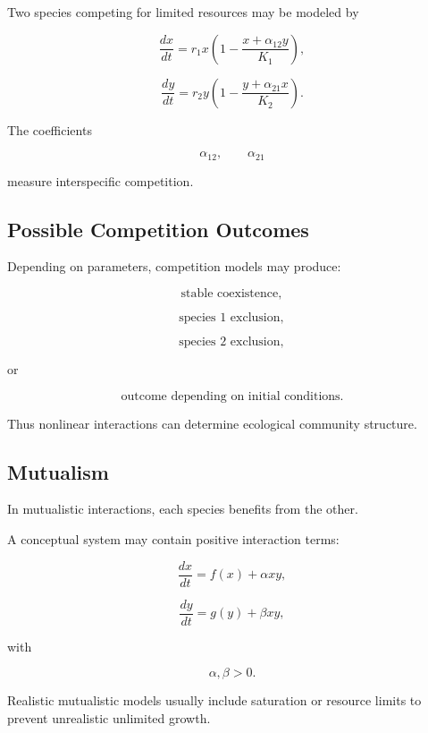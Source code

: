 Two species competing for limited resources may be modeled by

\[
\boxed{
\frac{dx}{dt}
=
r_1x
\left(
1-\frac{x+\alpha_{12}y}{K_1}
\right),
}
\]

\[
\boxed{
\frac{dy}{dt}
=
r_2y
\left(
1-\frac{y+\alpha_{21}x}{K_2}
\right).
}
\]

The coefficients

\[
\alpha_{12},
\qquad
\alpha_{21}
\]

measure interspecific competition.

\subsection{Possible Competition Outcomes}
\label{subsec:competition-outcomes}

Depending on parameters, competition models may produce:

\[
\boxed{
\text{stable coexistence},
}
\]

\[
\boxed{
\text{species 1 exclusion},
}
\]

\[
\boxed{
\text{species 2 exclusion},
}
\]

or

\[
\boxed{
\text{outcome depending on initial conditions}.
}
\]

Thus nonlinear interactions can determine ecological community structure.

\subsection{Mutualism}
\label{subsec:mutualism-models}

In mutualistic interactions, each species benefits from the other.

A conceptual system may contain positive interaction terms:

\[
\boxed{
\frac{dx}{dt}
=
f(x)+\alpha xy,
}
\]

\[
\boxed{
\frac{dy}{dt}
=
g(y)+\beta xy,
}
\]

with

\[
\alpha,\beta>0.
\]

Realistic mutualistic models usually include saturation or resource limits
to prevent unrealistic unlimited growth.

